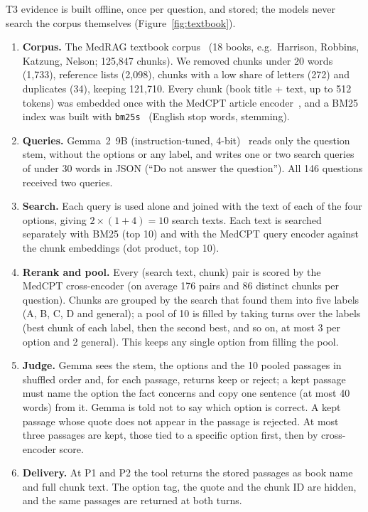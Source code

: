 T3 evidence is built offline, once per question, and stored; the models never search the corpus themselves (Figure~\ref{fig:textbook}).
\begin{enumerate}[leftmargin=1.5em, itemsep=1pt, topsep=2pt]
\item \textbf{Corpus.} The MedRAG textbook corpus~\citep{xiong2024} (18 books, e.g.\ Harrison, Robbins, Katzung, Nelson; 125,847 chunks). We removed chunks under 20 words (1,733), reference lists (2,098), chunks with a low share of letters (272) and duplicates (34), keeping 121,710. Every chunk (book title + text, up to 512 tokens) was embedded once with the MedCPT article encoder~\citep{jin2023medcpt}, and a BM25 index was built with \texttt{bm25s}~\citep{lu2024bm25s} (English stop words, stemming).
\item \textbf{Queries.} Gemma~2~9B (instruction-tuned, 4-bit)~\citep{gemma2024} reads only the question stem, without the options or any label, and writes one or two search queries of under 30 words in JSON (``Do not answer the question''). All 146 questions received two queries.
\item \textbf{Search.} Each query is used alone and joined with the text of each of the four options, giving $2\times(1+4)=10$ search texts. Each text is searched separately with BM25 (top 10) and with the MedCPT query encoder against the chunk embeddings (dot product, top 10).
\item \textbf{Rerank and pool.} Every (search text, chunk) pair is scored by the MedCPT cross-encoder (on average 176 pairs and 86 distinct chunks per question). Chunks are grouped by the search that found them into five labels (A, B, C, D and general); a pool of 10 is filled by taking turns over the labels (best chunk of each label, then the second best, and so on, at most 3 per option and 2 general). This keeps any single option from filling the pool.
\item \textbf{Judge.} Gemma sees the stem, the options and the 10 pooled passages in shuffled order and, for each passage, returns keep or reject; a kept passage must name the option the fact concerns and copy one sentence (at most 40 words) from it. Gemma is told not to say which option is correct. A kept passage whose quote does not appear in the passage is rejected. At most three passages are kept, those tied to a specific option first, then by cross-encoder score.
\item \textbf{Delivery.} At P1 and P2 the tool returns the stored passages as book name and full chunk text. The option tag, the quote and the chunk ID are hidden, and the same passages are returned at both turns.
\end{enumerate}
